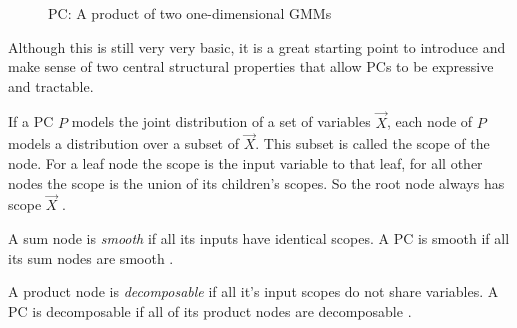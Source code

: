 \begin{figure}[h!]
    \centering
    \caption{PC: A product of two one-dimensional GMMs}
    \label{fig:spn_layered}
\end{figure}

Although this is still very very basic, it is a great starting point to introduce and make sense of two central structural 
properties that allow PCs to be expressive and tractable. 

\begin{definition}[Scope]
    If a PC $P$ models the joint distribution of a set of variables $\vec{X}$, each node of $P$ models a distribution over a subset of $\vec{X}$.
    This subset is called the scope of the node. For a leaf node the scope is the input variable to that leaf, for all other nodes the scope 
    is the union of its children's scopes. So the root node always has scope $\vec{X}$ \cite{pc_intro}.
\end{definition}

\begin{definition}[Smoothness]
    A sum node is \textit{smooth} if all its inputs have identical scopes. A PC is smooth if all its sum nodes are smooth \cite{pc_intro}.
\end{definition}
\begin{definition}[Decomposability]
    A product node is \textit{decomposable} if all it's input scopes do not share variables. A PC is decomposable if all of its product nodes are decomposable \cite{pc_intro}.
\end{definition}

